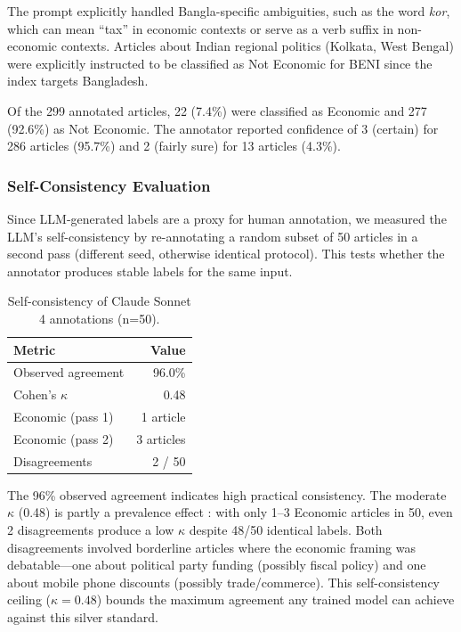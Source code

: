 The prompt explicitly handled Bangla-specific ambiguities, such as the word \textit{kor}, which can mean ``tax'' in economic contexts or serve as a verb suffix in non-economic contexts. Articles about Indian regional politics (Kolkata, West Bengal) were explicitly instructed to be classified as Not Economic for BENI since the index targets Bangladesh.

Of the 299 annotated articles, 22 (7.4\%) were classified as Economic and 277 (92.6\%) as Not Economic. The annotator reported confidence of 3 (certain) for 286 articles (95.7\%) and 2 (fairly sure) for 13 articles (4.3\%).

\subsubsection{Self-Consistency Evaluation}

Since LLM-generated labels are a proxy for human annotation, we measured the LLM's self-consistency by re-annotating a random subset of 50 articles in a second pass (different seed, otherwise identical protocol). This tests whether the annotator produces stable labels for the same input.

\begin{table}[h]
\centering
\begin{tabular}{lr}
\toprule
Metric & Value \\
\midrule
Observed agreement & 96.0\% \\
Cohen's $\kappa$ & 0.48 \\
Economic (pass 1) & 1 article \\
Economic (pass 2) & 3 articles \\
Disagreements & 2 / 50 \\
\bottomrule
\end{tabular}
\caption{Self-consistency of Claude Sonnet 4 annotations (n=50).}
\end{table}

The 96\% observed agreement indicates high practical consistency. The moderate $\kappa$ (0.48) is partly a prevalence effect \citep{feinstein1990high}: with only 1--3 Economic articles in 50, even 2 disagreements produce a low $\kappa$ despite 48/50 identical labels. Both disagreements involved borderline articles where the economic framing was debatable---one about political party funding (possibly fiscal policy) and one about mobile phone discounts (possibly trade/commerce). This self-consistency ceiling ($\kappa = 0.48$) bounds the maximum agreement any trained model can achieve against this silver standard.

